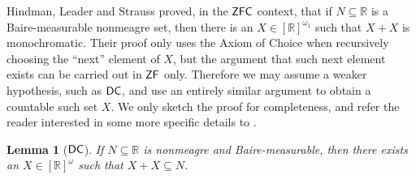 \documentclass[10pt,a4paper]{amsart}
\newtheorem{lemma}[theorem]{Lemma}
\theoremstyle{definition}
\newcommand{\zf}{\mathnormal{\mathsf{ZF}}}
\newcommand{\dc}{\mathnormal{\mathsf{DC}}}
\newcommand{\zfc}{\mathnormal{\mathsf{ZFC}}}
\theoremstyle{remark}
\numberwithin{equation}{section}
\begin{document}
Hindman, Leader and Strauss \cite{HindmanLeaderStrauss2017} proved, in the $\zfc$ context, that if $N\subseteq\mathbb R$ is a Baire-measurable nonmeagre set, then there is an $X\in[\mathbb R]^{\omega_1}$ such that $X+X$ is monochromatic. Their proof only uses the Axiom of Choice when recursively choosing the ``next'' element of $X$, but the argument that such next element exists can be carried out in $\zf$ only. Therefore we may assume a weaker hypothesis, such as $\dc$, and use an entirely similar argument to obtain a countable such set $X$. We only sketch the proof for completeness, and refer the reader interested in some more specific details to \cite[Lemma 4.1 and Theorem 4.2]{HindmanLeaderStrauss2017}.





\begin{lemma}[$\dc$]\label{lem:hls}
If $N\subseteq\mathbb{R}$ is nonmeagre and Baire-measurable, then there exists an $X\in[\mathbb{R}]^{\omega}$ such that $X+X\subseteq N$.
\end{lemma}
\end{document}
